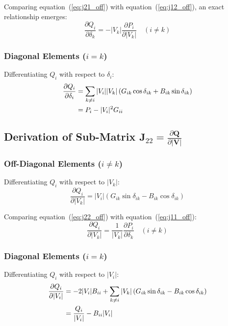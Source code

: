 \documentclass[12pt,a4paper,oneside]{report}
\begin{document}
Comparing equation~(\ref{eq:j21_off}) with equation~(\ref{eq:j12_off}), an exact relationship emerges:
\begin{equation}
\frac{\partial Q_i}{\partial \delta_k} = -|V_k| \frac{\partial P_i}{\partial |V_k|} \quad (i \neq k)
\end{equation}

\subsubsection{Diagonal Elements ($i = k$)}
Differentiating $Q_i$ with respect to $\delta_i$:
\begin{align}
\frac{\partial Q_i}{\partial \delta_i} &= \sum_{k \neq i} |V_i| |V_k| \left( G_{ik} \cos\delta_{ik} + B_{ik} \sin\delta_{ik} \right) \notag \\
&= P_i - |V_i|^2 G_{ii}
\label{eq:j21_diag}
\end{align}

\subsection{Derivation of Sub-Matrix $\mathbf{J}_{22} = \frac{\partial \mathbf{Q}}{\partial |\mathbf{V}|}$}

\subsubsection{Off-Diagonal Elements ($i \neq k$)}
Differentiating $Q_i$ with respect to $|V_k|$:
\begin{equation}
\frac{\partial Q_i}{\partial |V_k|} = |V_i| \left( G_{ik} \sin\delta_{ik} - B_{ik} \cos\delta_{ik} \right)
\label{eq:j22_off}
\end{equation}

Comparing equation~(\ref{eq:j22_off}) with equation~(\ref{eq:j11_off}):
\begin{equation}
\frac{\partial Q_i}{\partial |V_k|} = \frac{1}{|V_k|} \frac{\partial P_i}{\partial \delta_k} \quad (i \neq k)
\end{equation}

\subsubsection{Diagonal Elements ($i = k$)}
Differentiating $Q_i$ with respect to $|V_i|$:
\begin{align}
\frac{\partial Q_i}{\partial |V_i|} &= -2 |V_i| B_{ii} + \sum_{k \neq i} |V_k| \left( G_{ik} \sin\delta_{ik} - B_{ik} \cos\delta_{ik} \right) \notag \\
&= \frac{Q_i}{|V_i|} - B_{ii} |V_i|
\label{eq:j22_diag}
\end{align}
\end{document}
